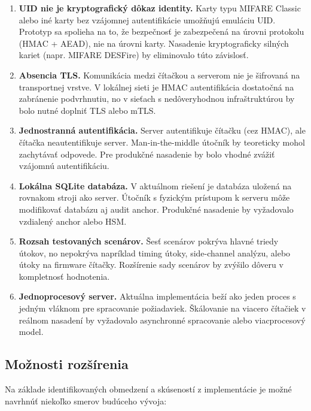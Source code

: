 \begin{enumerate}[leftmargin=*,itemsep=3pt]
  \item \textbf{UID nie je kryptografický dôkaz identity.} Karty typu MIFARE Classic\cite{GarciaMIFARE2008} alebo iné karty bez vzájomnej autentifikácie umožňujú emuláciu UID. Prototyp sa spolieha na to, že bezpečnosť je zabezpečená na úrovni protokolu (HMAC + AEAD), nie na úrovni karty. Nasadenie kryptograficky silných kariet (napr. MIFARE DESFire) by eliminovalo túto závislosť.

  \item \textbf{Absencia TLS.} Komunikácia medzi čítačkou a serverom nie je šifrovaná na transportnej vrstve. V lokálnej sieti je HMAC autentifikácia dostatočná na zabránenie podvrhnutiu, no v sieťach s nedôveryhodnou infraštruktúrou by bolo nutné doplniť TLS\cite{RFC8446} alebo mTLS.

  \item \textbf{Jednostranná autentifikácia.} Server autentifikuje čítačku (cez HMAC), ale čítačka neautentifikuje server. Man-in-the-middle útočník by teoreticky mohol zachytávať odpovede. Pre produkčné nasadenie by bolo vhodné zvážiť vzájomnú autentifikáciu\cite{RFC9325}.

  \item \textbf{Lokálna SQLite databáza.} V aktuálnom riešení je databáza uložená na rovnakom stroji ako server. Útočník s fyzickým prístupom k serveru môže modifikovať databázu aj audit anchor. Produkčné nasadenie by vyžadovalo vzdialený anchor alebo HSM\cite{NIST80057}.

  \item \textbf{Rozsah testovaných scenárov.} Šesť scenárov pokrýva hlavné triedy útokov, no nepokrýva napríklad timing útoky, side-channel analýzu, alebo útoky na firmware čítačky. Rozšírenie sady scenárov by zvýšilo dôveru v kompletnosť hodnotenia.

  \item \textbf{Jednoprocesový server.} Aktuálna implementácia beží ako jeden proces s jedným vláknom pre spracovanie požiadaviek. Škálovanie na viacero čítačiek v reálnom nasadení by vyžadovalo asynchronné spracovanie alebo viacprocesový model.
\end{enumerate}

\subsection{Možnosti rozšírenia}

Na základe identifikovaných obmedzení a skúseností z implementácie je možné navrhnúť niekoľko smerov budúceho vývoja:

